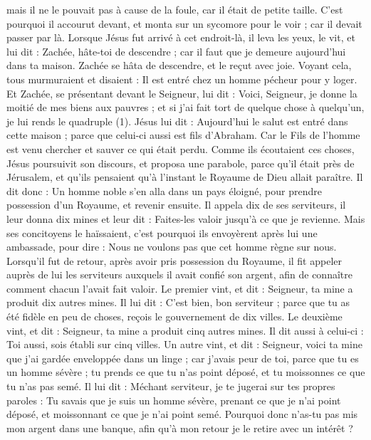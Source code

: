 \begin{multicols}{2}
mais il ne le pouvait pas à cause de la foule, car il était de petite taille.
C'est pourquoi il accourut devant, et monta sur un sycomore pour le voir ; car il devait passer par là.
Lorsque Jésus fut arrivé à cet endroit-là, il leva les yeux, le vit, et lui dit : Zachée, hâte-toi de descendre ; car il faut que je demeure aujourd'hui dans ta maison.
Zachée se hâta de descendre, et le reçut avec joie.
Voyant cela, tous murmuraient et disaient : Il est entré chez un homme pécheur pour y loger.
Et Zachée, se présentant devant le Seigneur, lui dit : Voici, Seigneur, je donne la moitié de mes biens aux pauvres ; et si j'ai fait tort de quelque chose à quelqu'un, je lui rends le quadruple (1).
Jésus lui dit : Aujourd'hui le salut est entré dans cette maison ; parce que celui-ci aussi est fils d'Abraham.
Car le Fils de l'homme est venu chercher et sauver ce qui était perdu.
Comme ils écoutaient ces choses, Jésus poursuivit son discours, et proposa une parabole, parce qu'il était près de Jérusalem, et qu'ils pensaient qu'à l'instant le Royaume de Dieu allait paraître.
Il dit donc : Un homme noble s'en alla dans un pays éloigné, pour prendre possession d'un Royaume, et revenir ensuite.
Il appela dix de ses serviteurs, il leur donna dix mines et leur dit : Faites-les valoir jusqu'à ce que je revienne.
Mais ses concitoyens le haïssaient, c'est pourquoi ils envoyèrent après lui une ambassade, pour dire : Nous ne voulons pas que cet homme règne sur nous.
Lorsqu’il fut de retour, après avoir pris possession du Royaume, il fit appeler auprès de lui les serviteurs auxquels il avait confié son argent, afin de connaître comment chacun l’avait fait valoir.
Le premier vint, et dit : Seigneur, ta mine a produit dix autres mines.
Il lui dit : C’est bien, bon serviteur ; parce que tu as été fidèle en peu de choses, reçois le gouvernement de dix villes.
Le deuxième vint, et dit : Seigneur, ta mine a produit cinq autres mines.
Il dit aussi à celui-ci : Toi aussi, sois établi sur cinq villes.
Un autre vint, et dit : Seigneur, voici ta mine que j'ai gardée enveloppée dans un linge ;
car j’avais peur de toi, parce que tu es un homme sévère ; tu prends ce que tu n'as point déposé, et tu moissonnes ce que tu n'as pas semé.
Il lui dit : Méchant serviteur, je te jugerai sur tes propres paroles : Tu savais que je suis un homme sévère, prenant ce que je n'ai point déposé, et moissonnant ce que je n'ai point semé.
Pourquoi donc n'as-tu pas mis mon argent dans une banque, afin qu’à mon retour je le retire avec un intérêt ?

\end{multicols}
